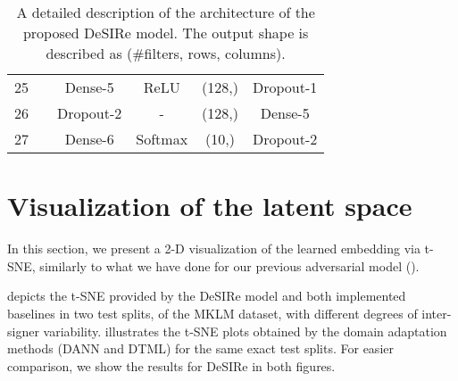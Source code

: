 \begin{table}[t]
\begin{tabular}{c|c|c|c|c|c}
            25                                                          &                                                                 & Dense-5                                                                           & ReLU                                                              & (128,)                & Dropout-1                                                                                \\
            26                                                          &                                                                 & Dropout-2                                                                          & -                                                                 & (128,)                & Dense-5                                                                                  \\
            27                                                          &                                                                 & Dense-6                                                                          & Softmax                                                              & (10,)                 & Dropout-2                                                                                \\
        \end{tabular}
    \caption{A detailed description of the architecture of the proposed DeSIRe model. The output shape is described as (\#filters, rows, columns).}
    \label{table:desire_arch}
\end{table}

\section{Visualization of the latent space}
\label{sec:desire_tsne}
In this section, we present a 2-D visualization of the learned embedding via t-SNE, similarly to what we have done for our previous adversarial model ().

 depicts the t-SNE provided by the DeSIRe model and both implemented baselines in two test splits, of the MKLM dataset, with different degrees of inter-signer variability.  illustrates the t-SNE plots obtained by the domain adaptation methods (DANN and DTML) for the same exact test splits. For easier comparison, we show the results for DeSIRe in both figures.

